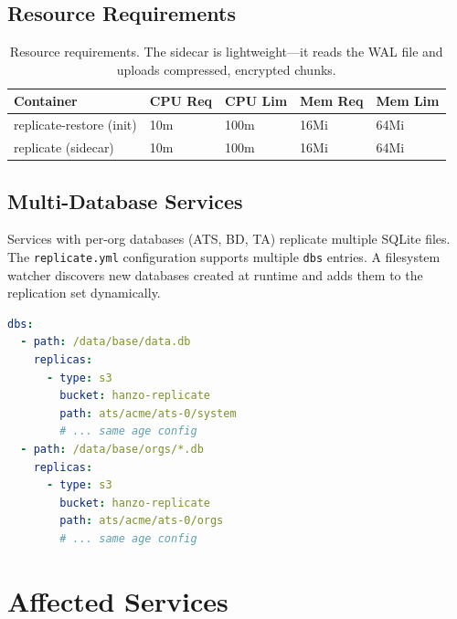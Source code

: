\documentclass[11pt]{article}
\begin{document}
\subsection{Resource Requirements}

\begin{table}[H]
\centering
\begin{tabular}{@{}lllll@{}}
\toprule
\textbf{Container} & \textbf{CPU Req} & \textbf{CPU Lim} & \textbf{Mem Req} & \textbf{Mem Lim} \\
\midrule
replicate-restore (init) & 10m   & 100m  & 16Mi  & 64Mi \\
replicate (sidecar)      & 10m   & 100m  & 16Mi  & 64Mi \\
\bottomrule
\end{tabular}
\caption{Resource requirements. The sidecar is lightweight---it reads the WAL file
and uploads compressed, encrypted chunks.}
\label{tab:resources}
\end{table}

\subsection{Multi-Database Services}

Services with per-org databases (ATS, BD, TA) replicate multiple SQLite
files. The \texttt{replicate.yml} configuration supports multiple
\texttt{dbs} entries. A filesystem watcher discovers new databases created at
runtime and adds them to the replication set dynamically.

\begin{lstlisting}[language=YAML,caption={Multi-database configuration.}]
dbs:
  - path: /data/base/data.db
    replicas:
      - type: s3
        bucket: hanzo-replicate
        path: ats/acme/ats-0/system
        # ... same age config
  - path: /data/base/orgs/*.db
    replicas:
      - type: s3
        bucket: hanzo-replicate
        path: ats/acme/ats-0/orgs
        # ... same age config
\end{lstlisting}

\section{Affected Services}
\end{document}
